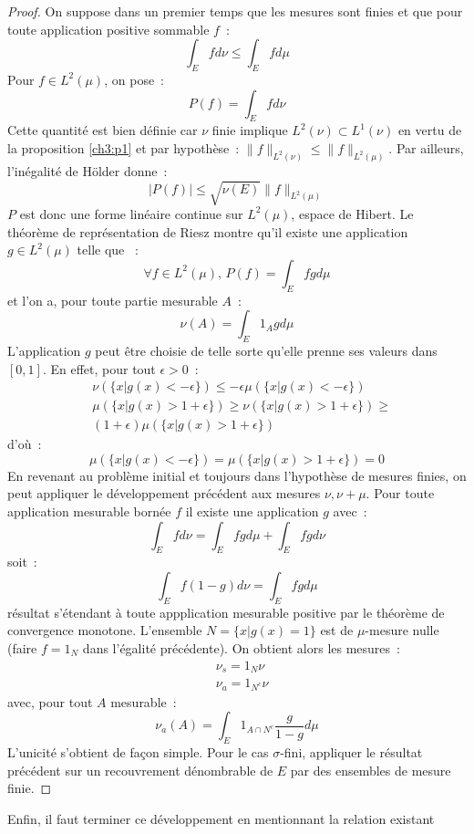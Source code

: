 \begin{proof}
On suppose dans un premier temps que les mesures sont finies et que
pour toute application positive sommable $f$~: 
\[
\int_E f d \nu \leq \int_E f d \mu
\]
Pour $f \in L^2(\mu)$, on pose~:
\[
P(f) = \int_E f d \nu
\]
Cette quantité est bien définie car $\nu$ finie implique $L^2(\nu) \subset
L^1(\nu)$ en vertu de la proposition \ref{ch3:p1} et par hypothèse~:
$\|f\|_{L^2(\nu)} \leq \|f\|_{L^2(\mu)}$. Par ailleurs,
l'inégalité de Hölder donne~:
\[
|P(f)| \leq \sqrt{\nu(E)} \|f\|_{L^2(\mu)}
\]
$P$ est donc une forme linéaire continue sur $L^2(\mu)$, espace de
Hibert. Le théorème de représentation de Riesz montre qu'il existe une
application $g \in L^2(\mu)$ telle que ~:
\[
\forall f \in L^2(\mu), \, P(f) = \int_E f g  d \mu
\]
et l'on a, pour toute partie mesurable $A$~:
\[
\nu(A) = \int_E 1_A g d \mu
\]
L'application $g$ peut être choisie de telle sorte qu'elle prenne ses
valeurs dans $[0,1]$. En effet, pour tout $\epsilon > 0$~:
\begin{align*}
&\nu(\{x | g(x) < - \epsilon \})
\leq -\epsilon \mu(\{x| g(x) < - \epsilon \}) \\
&\mu(\{x | g(x) > 1 + \epsilon \}) \geq \nu(\{x | g(x) > 1 + \epsilon
\}) \geq \\
& (1+\epsilon) \mu(\{x | g(x) > 1 + \epsilon \})
\end{align*}
d'où~:
\[
\mu(\{x | g(x) < - \epsilon \}) = \mu(\{x | g(x) > 1 + \epsilon \}) = 0
\]
En revenant au problème initial et toujours dans l'hypothèse de
mesures finies, on peut appliquer le développement
précédent aux mesures $\nu, \nu+\mu$. Pour toute application mesurable
bornée $f$ il existe une application $g$ avec~:
\[
\int_E f d \nu = \int_E f g d \mu + \int_E f g d \nu
\]
soit~:
\[
\int_E f (1-g) d \nu = \int_E fg d \mu 
\]
résultat s'étendant à toute appplication mesurable positive par le
théorème de convergence monotone. 
L'ensemble $N = \{ x | g(x) = 1 \}$ est de $\mu$-mesure nulle (faire
$f=1_N$ dans l'égalité précédente). On obtient alors les mesures~:
\begin{align*}
& \nu_s = 1_N \nu \\
& \nu_a = 1_{N^c} \nu
\end{align*}
avec, pour tout $A$ mesurable~:
\[
\nu_a(A) = \int_E 1_{A \cap N^c} \frac{g}{1-g} d \mu
\]
L'unicité s'obtient de façon simple. Pour le cas $\sigma$-fini,
appliquer le résultat précédent sur un recouvrement dénombrable de $E$ par des
ensembles de mesure finie.
\end{proof}
Enfin, il faut terminer ce développement en mentionnant la relation existant
